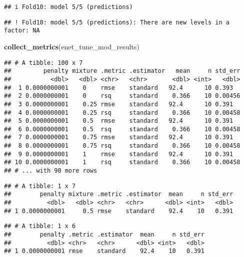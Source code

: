 \documentclass[
]{article}
\newenvironment{Shaded}{\begin{snugshade}}{\end{snugshade}}
\newcommand{\DataTypeTok}[1]{\textcolor[rgb]{0.13,0.29,0.53}{#1}}
\newcommand{\DecValTok}[1]{\textcolor[rgb]{0.00,0.00,0.81}{#1}}
\newcommand{\KeywordTok}[1]{\textcolor[rgb]{0.13,0.29,0.53}{\textbf{#1}}}
\newcommand{\NormalTok}[1]{#1}
\newcommand{\OperatorTok}[1]{\textcolor[rgb]{0.81,0.36,0.00}{\textbf{#1}}}
\newcommand{\StringTok}[1]{\textcolor[rgb]{0.31,0.60,0.02}{#1}}
\begin{document}
\begin{verbatim}
## i Fold10: model 5/5 (predictions)
\end{verbatim}

\begin{verbatim}
## ! Fold10: model 5/5 (predictions): There are new levels in a factor: NA
\end{verbatim}

\begin{Shaded}
\begin{Highlighting}[]
\KeywordTok{collect_metrics}\NormalTok{(enet_tune_mod_results)}
\end{Highlighting}
\end{Shaded}

\begin{verbatim}
## # A tibble: 100 x 7
##         penalty mixture .metric .estimator   mean     n std_err
##           <dbl>   <dbl> <chr>   <chr>       <dbl> <int>   <dbl>
##  1 0.0000000001    0    rmse    standard   92.4      10 0.393  
##  2 0.0000000001    0    rsq     standard    0.366    10 0.00456
##  3 0.0000000001    0.25 rmse    standard   92.4      10 0.391  
##  4 0.0000000001    0.25 rsq     standard    0.366    10 0.00458
##  5 0.0000000001    0.5  rmse    standard   92.4      10 0.391  
##  6 0.0000000001    0.5  rsq     standard    0.366    10 0.00458
##  7 0.0000000001    0.75 rmse    standard   92.4      10 0.391  
##  8 0.0000000001    0.75 rsq     standard    0.366    10 0.00458
##  9 0.0000000001    1    rmse    standard   92.4      10 0.391  
## 10 0.0000000001    1    rsq     standard    0.366    10 0.00458
## # ... with 90 more rows
\end{verbatim}

\begin{Shaded}
\end{Shaded}

\begin{verbatim}
## # A tibble: 1 x 7
##        penalty mixture .metric .estimator  mean     n std_err
##          <dbl>   <dbl> <chr>   <chr>      <dbl> <int>   <dbl>
## 1 0.0000000001     0.5 rmse    standard    92.4    10   0.391
\end{verbatim}

\begin{Shaded}
\end{Shaded}

\begin{verbatim}
## # A tibble: 1 x 6
##        penalty .metric .estimator  mean     n std_err
##          <dbl> <chr>   <chr>      <dbl> <int>   <dbl>
## 1 0.0000000001 rmse    standard    92.4    10   0.391
\end{verbatim}
\end{document}
